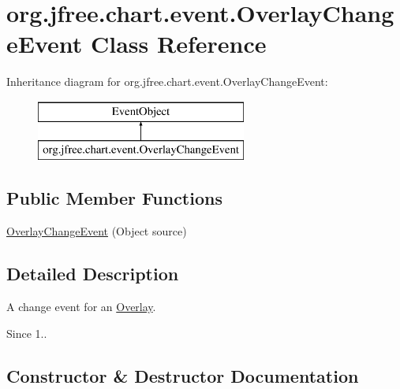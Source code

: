 \hypertarget{classorg_1_1jfree_1_1chart_1_1event_1_1_overlay_change_event}{}\section{org.\+jfree.\+chart.\+event.\+Overlay\+Change\+Event Class Reference}
\label{classorg_1_1jfree_1_1chart_1_1event_1_1_overlay_change_event}
Inheritance diagram for org.\+jfree.\+chart.\+event.\+Overlay\+Change\+Event\+:\begin{figure}[H]
\begin{center}
\leavevmode
\includegraphics[height=2.000000cm]{classorg_1_1jfree_1_1chart_1_1event_1_1_overlay_change_event}
\end{center}
\end{figure}
\subsection*{Public Member Functions}
\begin{DoxyCompactItemize}
\item 
\mbox{\hyperlink{classorg_1_1jfree_1_1chart_1_1event_1_1_overlay_change_event_adaf95eeef4ee97bfd8ae9d5de0dd92da}{Overlay\+Change\+Event}} (Object source)
\end{DoxyCompactItemize}


\subsection{Detailed Description}
A change event for an \mbox{\hyperlink{}{Overlay}}.

\begin{DoxySince}{Since}
1.. 
\end{DoxySince}


\subsection{Constructor \& Destructor Documentation}
\mbox{\label{classorg_1_1jfree_1_1chart_1_1event_1_1_overlay_change_event_adaf95eeef4ee97bfd8ae9d5de0dd92da}} 
